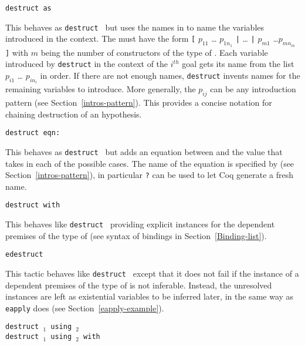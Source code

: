 \begin{coq_example*}
\begin{Variants}
\item{\tt destruct {\term} as {\disjconjintropattern}}

  This behaves as {\tt destruct {\term}} but uses the names in
  {\intropattern} to name the variables introduced in the context.
  The {\intropattern} must have the form {\tt [} $p_{11}$ \ldots
    $p_{1n_1}$ {\tt |} {\ldots} {\tt |} $p_{m1}$ \ldots $p_{mn_m}$
    {\tt ]} with $m$ being the number of constructors of the type of
  {\term}. Each variable introduced by {\tt destruct} in the context
  of the $i^{th}$ goal gets its name from the list $p_{i1}$ \ldots
  $p_{in_i}$ in order. If there are not enough names, {\tt destruct}
  invents names for the remaining variables to introduce. More
  generally, the $p_{ij}$ can be any introduction pattern (see
  Section~\ref{intros-pattern}). This provides a concise notation for
  chaining destruction of an hypothesis.


\item{\tt destruct {\term} eqn:{\namingintropattern}}

  This behaves as {\tt destruct {\term}} but adds an equation between
  {\term} and the value that {\term} takes in each of the possible
  cases.  The name of the equation is specified by {\namingintropattern}
  (see Section~\ref{intros-pattern}), in particular {\tt ?} can be
  used to let Coq generate a fresh name.

\item{\tt destruct {\term} with \bindinglist}

  This behaves like \texttt{destruct {\term}} providing explicit
  instances for the dependent premises of the type of {\term} (see
  syntax of bindings in Section~\ref{Binding-list}).

\item{\tt edestruct {\term}}

  This tactic behaves like \texttt{destruct {\term}} except that it
  does not fail if the instance of a dependent premises of the type of
  {\term} is not inferable. Instead, the unresolved instances are left
  as existential variables to be inferred later, in the same way as
  {\tt eapply} does (see Section~\ref{eapply-example}).

\item{\tt destruct {\term$_1$} using {\term$_2$}}\\
     {\tt destruct {\term$_1$} using {\term$_2$} with {\bindinglist}}


\end{Variants}
\end{coq_example*}
